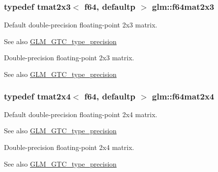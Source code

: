 \subsubsection[{f64mat2x3}]{\setlength{\rightskip}{0pt plus 5cm}typedef tmat2x3$<$ f64, defaultp $>$ {\bf glm\+::f64mat2x3}}\label{group__gtc__type__precision_ga6d0196bded514d55e26e0f68dd38b37b}
Default double-\/precision floating-\/point 2x3 matrix. \begin{DoxySeeAlso}{See also}
\hyperlink{group__gtc__type__precision}{G\+L\+M\+\_\+\+G\+T\+C\+\_\+type\+\_\+precision}
\end{DoxySeeAlso}
Double-\/precision floating-\/point 2x3 matrix. \begin{DoxySeeAlso}{See also}
\hyperlink{group__gtc__type__precision}{G\+L\+M\+\_\+\+G\+T\+C\+\_\+type\+\_\+precision} 
\end{DoxySeeAlso}
\hypertarget{group__gtc__type__precision_gaf18b9f693f2ef743d93c9afd5cfbe229}{}
\subsubsection[{f64mat2x4}]{\setlength{\rightskip}{0pt plus 5cm}typedef tmat2x4$<$ f64, defaultp $>$ {\bf glm\+::f64mat2x4}}\label{group__gtc__type__precision_gaf18b9f693f2ef743d93c9afd5cfbe229}
Default double-\/precision floating-\/point 2x4 matrix. \begin{DoxySeeAlso}{See also}
\hyperlink{group__gtc__type__precision}{G\+L\+M\+\_\+\+G\+T\+C\+\_\+type\+\_\+precision}
\end{DoxySeeAlso}
Double-\/precision floating-\/point 2x4 matrix. \begin{DoxySeeAlso}{See also}
\hyperlink{group__gtc__type__precision}{G\+L\+M\+\_\+\+G\+T\+C\+\_\+type\+\_\+precision} 
\end{DoxySeeAlso}
\hypertarget{group__gtc__type__precision_ga44f23eb3c2e893d0afb1aa2b9e89be76}{}
